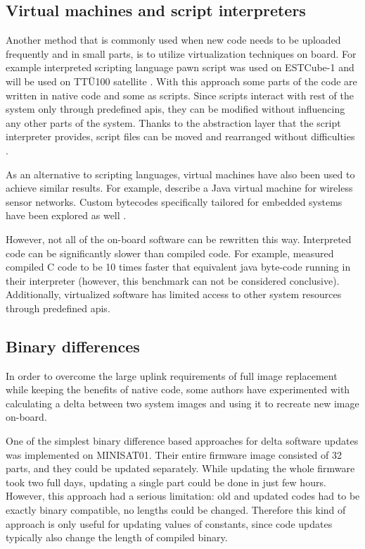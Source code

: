 \subsection{Virtual machines and script interpreters}

Another method that is commonly used when new code needs to be uploaded frequently and in small parts, is to utilize virtualization techniques on board. For example interpreted scripting language pawn script was used on ESTCube-1 \cite{Suenter2016} and will be used on TTÜ100 satellite \cite{Aasavaeli2017}. With this approach some parts of the code are written in native code and some as scripts. Since scripts interact with rest of the system only through predefined \glspl{api}, they can be modified without influencing any other parts of the system. Thanks to the abstraction layer that the script interpreter provides, script files can be moved and rearranged without difficulties \cite{Riemersma2017}.

As an alternative to scripting languages, virtual machines have also been used to achieve similar results. For example, \textcite{Simon2006} describe a Java virtual machine for wireless sensor networks. Custom bytecodes specifically tailored for embedded systems have been explored as well \cite{Levis2002}.

However, not all of the on-board software can be rewritten this way. Interpreted code can be significantly slower than compiled code. For example, \textcite{Simon2006} measured compiled C code to be 10 times faster that equivalent java byte-code running in their interpreter (however, this benchmark can not be considered conclusive). Additionally, virtualized software has limited access to other system resources through predefined \glspl{api}.

\subsection{Binary differences}

In order to overcome the large uplink requirements of full image replacement while keeping the benefits of native code, some authors have experimented with calculating a delta between two system images and using it to recreate new image on-board.

One of the simplest binary difference based approaches for delta software updates was implemented on MINISAT01. Their entire firmware image consisted of 32 parts, and they could be updated separately. While updating the whole firmware took two full days, updating a single part could be done in just few hours. However, this approach had a serious limitation: old and updated codes had to be exactly binary compatible, no lengths could be changed. Therefore this kind of approach is only useful for updating values of constants, since code updates typically also change the length of compiled binary. \cite{Garrido1998}

